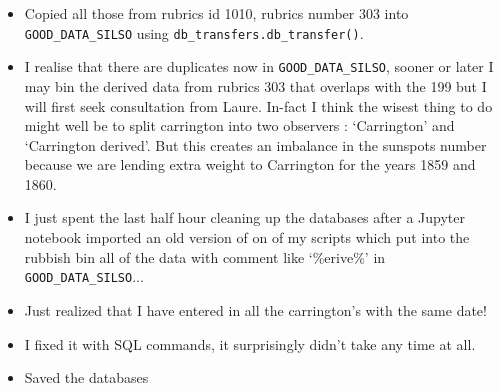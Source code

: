 \documentclass[12pt]{article}
\begin{document}
\begin{itemize}
    \item Copied all those from rubrics id 1010, rubrics number 303 into \texttt{GOOD\_DATA\_SILSO} using \texttt{db\_transfers.db\_transfer()}. 
    \item I realise that there are duplicates now in \texttt{GOOD\_DATA\_SILSO}, sooner or later I may bin the derived data from rubrics 303 that overlaps with the 199 but I will first seek consultation from Laure. In-fact I think the wisest thing to do might well be to split carrington into two observers : `Carrington' and `Carrington derived'. But this creates an imbalance in the sunspots number because we are lending extra weight to Carrington for the years 1859 and 1860.
    \item I just spent the last half hour cleaning up the databases after a Jupyter notebook imported an old version of on of my scripts which put into the rubbish bin all of the data with comment like `\%erive\%' in \texttt{GOOD\_DATA\_SILSO}...
    \item Just realized that I have entered in all the carrington's with the same date!
    \item I fixed it with SQL commands, it surprisingly didn't take any time at all.
    \item Saved the databases
\end{itemize}
\end{document}
